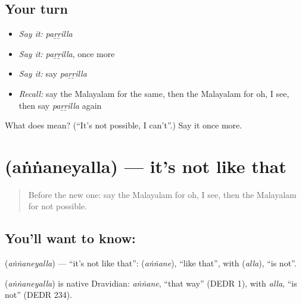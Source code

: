 \subsection*{Your turn}
\begin{itemize}
\raggedright
  \item \emph{Say it:} \emph{paṟṟilla}
  \item \emph{Say it:} \emph{paṟṟilla}, once more
  \item \emph{Say it:} say \emph{paṟṟilla}
  \item \emph{Recall:} say the Malayalam for the same, then the Malayalam for oh, I see, then say \emph{paṟṟilla} again
\end{itemize}

\begin{tcolorbox}[breakable,colback=teal!4,colframe=teal!35!black,title={Before you move on}]
What does  mean? (\textquotedblleft{}It's not possible, I can't\textquotedblright{}.) Say it once more.
\end{tcolorbox}
\section[\texorpdfstring{\ml{അങ്ങനെയല്ല} (aṅṅaneyalla)}{അങ്ങനെയല്ല (aṅṅaneyalla)}]{ (aṅṅaneyalla) — it's not like that}

\label{lesson:ML-C123-notlikethat}



\begin{quote}
Before the new one: say the Malayalam for oh, I see, then the Malayalam for not possible.
\end{quote}

\subsection*{You'll want to know: }
\textbf{} (\emph{aṅṅaneyalla}) — \textquotedblleft{}it's not like that\textquotedblright{}: \textbf{} (\emph{aṅṅane}), \textquotedblleft{}like that\textquotedblright{}, with \textbf{} (\emph{alla}), \textquotedblleft{}is not\textquotedblright{}.

\begin{cousinweb}
\textbf{} (\emph{aṅṅaneyalla}) is native Dravidian: \emph{aṅṅane}, \textquotedblleft{}that way\textquotedblright{} (DEDR 1), with \emph{alla}, \textquotedblleft{}is not\textquotedblright{} (DEDR 234).
\end{cousinweb}

